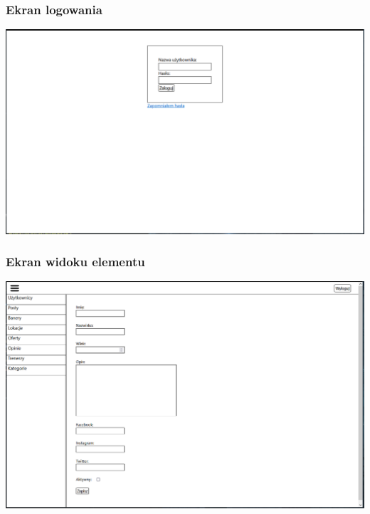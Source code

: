 \documentclass[12pt]{article}
\begin{document}
\subsubsection{Ekran logowania}
\includegraphics[width=1\textwidth, angle=0]{images/Interfejs_login.png}
\subsubsection{Ekran widoku elementu}
\includegraphics[width=1\textwidth, angle=0]{images/Interfejs_view.png}
\end{document}
